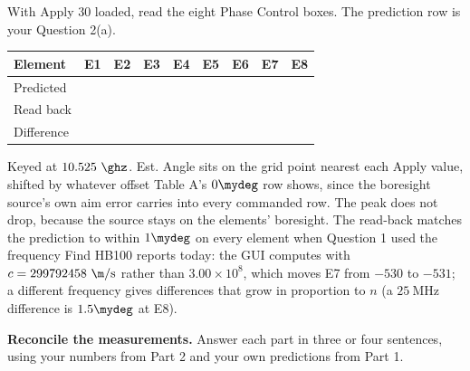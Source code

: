 \documentclass{exam}
\newif\ifkey
\newcommand{\kv}[1]{\ifkey{\color{red}#1}\fi\rule[-0.10in]{0pt}{0.34in}}
\begin{document}
\begin{questions}
With Apply $30$ loaded, read the eight Phase Control boxes. The prediction row is
your Question 2(a).

\begin{center}
\small
\setlength{\tabcolsep}{4pt}
\renewcommand{\arraystretch}{1.25}
\begin{tabular}{| l | K{0.55in} | K{0.55in} | K{0.55in} | K{0.55in} | K{0.55in} | K{0.55in} | K{0.55in} | K{0.55in} |}
\hline
\textbf{Element} & \textbf{E1} & \textbf{E2} & \textbf{E3} & \textbf{E4} & \textbf{E5} & \textbf{E6} & \textbf{E7} & \textbf{E8} \\\hline\hline
Predicted & \kv{$0$} & \kv{$-88$} & \kv{$-177$} & \kv{$-265$} & \kv{$-354$} & \kv{$-442$} & \kv{$-530$} & \kv{$-619$} \\\hline
Read back & \kv{$0$} & \kv{$-88$} & \kv{$-177$} & \kv{$-265$} & \kv{$-354$} & \kv{$-442$} & \kv{$-531$} & \kv{$-619$} \\\hline
Difference & \kv{$0$} & \kv{$0$} & \kv{$0$} & \kv{$0$} & \kv{$0$} & \kv{$0$} & \kv{$-1$} & \kv{$0$} \\\hline
\end{tabular}
\end{center}

\begin{solution}
Keyed at $10.525\ \ghz$. Est. Angle sits on the grid point nearest each Apply
value, shifted by whatever offset Table A's $0\mydeg$ row shows, since the
boresight source's own aim error carries into every commanded row. The peak does
not drop, because the source stays on the elements' boresight. The read-back
matches the prediction to within $1\mydeg$ on every element when Question 1 used
the frequency Find HB100 reports today: the GUI computes with
$c = 299792458\ \m/\text{s}$ rather than $3.00\times 10^8$, which moves E7 from
$-530$ to $-531$; a different frequency gives differences that grow in proportion
to $n$ (a $25\ \text{MHz}$ difference is $1.5\mydeg$ at E8).
\end{solution}

\newpage
{}

\question \textbf{Reconcile the measurements.} Answer each part in three or four
sentences, using your numbers from Part 2 and your own predictions from
Part 1.

\begin{parts}


\end{parts}
\end{questions}
\end{document}

